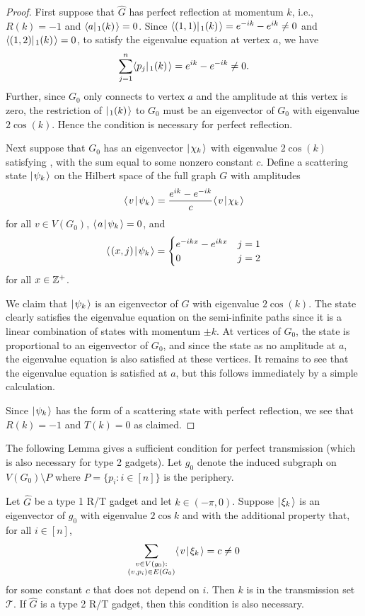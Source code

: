 \documentclass[../thesis-main/thesis-main]{subfiles}
\begin{document}
\begin{proof}
First suppose that $\hat{G}$ has perfect reflection at momentum $k$, i.e., $R(k)=-1$ and $\langle{a}|\mspace{2mu} \sc_{1} (k) \mspace{2mu} \rangle=0$. Since $\langle{(1,1)}|\mspace{2mu} \sc_1(k) \mspace{2mu} \rangle = e^{-ik} - e^{ik}\neq 0$ and $\langle{(1,2)}|\mspace{2mu} \sc_1(k) \mspace{2mu} \rangle=0$, to satisfy the eigenvalue equation at vertex $a$, we have
\[
  \sum_{j=1}^{n} \langle{p_j}|\mspace{2mu} \sc_1(k) \mspace{2mu} \rangle = e^{ik} - e^{-ik} \neq 0.
\]
Further, since $G_0$ only connects to vertex $a$ and the amplitude at this vertex is zero, the restriction of $|\mspace{2mu} \sc_1(k) \mspace{2mu} \rangle$ to $G_0$ must be an eigenvector of $G_0$ with eigenvalue $2\cos(k)$. Hence the condition is necessary for perfect reflection. 
 
Next suppose that $G_0$ has an eigenvector $|\mspace{2mu} \chi_k \mspace{2mu} \rangle$ with eigenvalue $2\cos(k)$ satisfying , with the sum equal to some nonzero constant $c$. Define a scattering state $|\mspace{2mu} \psi_k \mspace{2mu} \rangle$ on the Hilbert space of the full graph $G$ with amplitudes
\[
  \langle\mspace{2mu} v \mspace{2mu} | \mspace{2mu} \psi_k\mspace{2mu} \rangle = \frac{e^{ik} - e^{-ik}}{c} \langle\mspace{2mu} v \mspace{2mu} | \mspace{2mu} \chi_k\mspace{2mu} \rangle
\]
for all $v \in V(G_0)$, $\langle\mspace{2mu} a \mspace{2mu} | \mspace{2mu} \psi_k\mspace{2mu} \rangle=0$, and 
\[
 \langle\mspace{2mu} (x,j) \mspace{2mu} | \mspace{2mu} \psi_k\mspace{2mu} \rangle=\begin{cases} e^{-ikx}-e^{ikx} & j=1\\
0 & j=2
\end{cases}
\]
for all $x \in \mathbb{Z}^+$.

We claim that $|\mspace{2mu} \psi_k \mspace{2mu} \rangle$ is an eigenvector of $G$ with eigenvalue $2 \cos(k)$.  The state clearly satisfies the eigenvalue equation on the semi-infinite paths since it is a linear combination of states with momentum $\pm k$.  At vertices of $G_0$, the state is proportional to an eigenvector of $G_0$, and since the state as no amplitude at $a$, the eigenvalue equation is also satisfied at these vertices.  It remains to see that the eigenvalue equation is satisfied at $a$, but this follows immediately by a simple calculation.

Since $|\mspace{2mu} \psi_k \mspace{2mu} \rangle$ has the form of a scattering state with perfect reflection, we see that $R(k)=-1$ and $T(k)=0$ as claimed.
\end{proof}

The following Lemma gives a sufficient condition for perfect transmission (which is also necessary for type 2 gadgets).  Let $g_0$ denote the induced subgraph on $V(G_0)\setminus P$ where $P = \{p_i\colon i\in [n]\}$ is the periphery.

\begin{lemma}\label{lem:transmit_reqs}
Let $\hat{G}$ be a type 1 R/T gadget and let $k\in (-\pi,0)$. Suppose $|\mspace{2mu} \xi_k \mspace{2mu} \rangle$ is an eigenvector of $g_0$ with eigenvalue $2\cos{k}$ and with the additional property that, for all $i \in [n]$,
\begin{equation}
\label{eq:trans_cond}
  \sum_{\substack{v \in V(g_0): \\ (v,p_i)\in E(G_0)}} \langle\mspace{2mu} v \mspace{2mu} | \mspace{2mu} \xi_k\mspace{2mu} \rangle = c \neq 0 
\end{equation}
for some constant $c$ that does not depend on $i$. Then $k$ is in the transmission set $\mathcal{T}$. If $\hat{G}$ is a type 2 R/T gadget, then this condition is also necessary.
\end{lemma}
\end{document}
